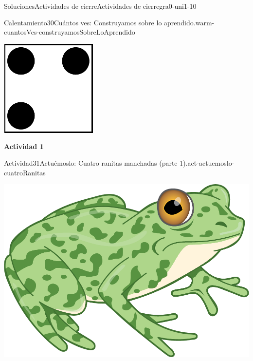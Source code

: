 \documentclass[twoside,10pt,]{article}
\begin{document}
\begin{solutions-section}{Soluciones}{Actividades de cierre}{}{Actividades de cierre}{}{}{gra0-uni1-10}
\begin{explorationsolution}{Calentamiento}{30}{Cuántos ves: Construyamos sobre lo aprendido.}{warm-cuantosVes-construyamosSobreLoAprendido}
\begin{sidebyside}{2}{0}{0}{0}
\begin{sbspanel}{0.5}
\includegraphics[width=\linewidth]{external/svg-source/tikz-file-147346.pdf}
\end{sbspanel}%
\end{sidebyside}%
\end{explorationsolution}%
\par\medskip
\noindent\textbf{\large{}\space\textperiodcentered\space{}Actividad 1}
\begin{activitysolution}{Actividad}{31}{Actuémoslo: Cuatro ranitas manchadas (parte 1).}{act-actuemoslo-cuatroRanitas}%
\begin{image}{0.275}{0.45}{0.275}{}%
\includegraphics[width=\linewidth]{external/png-source/RANA-VERDE.png}

\end{image}
\end{activitysolution}
\end{solutions-section}
\end{document}
